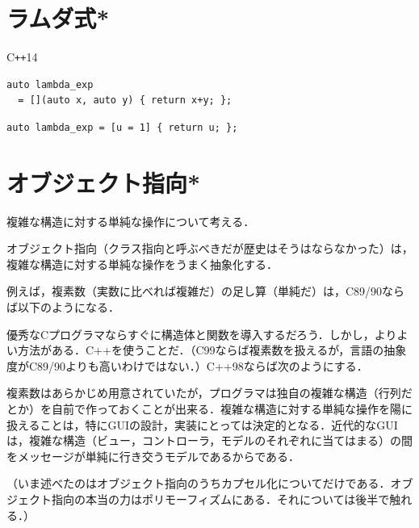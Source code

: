 \documentclass[a4paper,twocolumn]{jsbook}
\newcommand{\programminglanguage}[1]{\textsf{#1}}
\newcommand{\cxx}{\programminglanguage{C}\texttt{++}}
\newcommand{\cxxfourteen}{\cxx\programminglanguage{14}}
\begin{document}
\section{ラムダ式*}

\cxxfourteen
\begin{verbatim}
auto lambda_exp
  = [](auto x, auto y) { return x+y; };
\end{verbatim}

\begin{verbatim}
auto lambda_exp = [u = 1] { return u; };
\end{verbatim}



\section{オブジェクト指向*}

複雑な構造に対する単純な操作について考える．

オブジェクト指向（クラス指向と呼ぶべきだが歴史はそうはならなかった）は，複雑な構造に対する単純な操作をうまく抽象化する．

例えば，複素数（実数に比べれば複雑だ）の足し算（単純だ）は，C89/90ならば以下のようになる．


優秀なCプログラマならすぐに構造体と関数を導入するだろう．しかし，よりよい方法がある．C++を使うことだ．（C99ならば複素数を扱えるが，言語の抽象度がC89/90よりも高いわけではない．）C++98ならば次のようにする．


複素数はあらかじめ用意されていたが，プログラマは独自の複雑な構造（行列だとか）を自前で作っておくことが出来る．複雑な構造に対する単純な操作を陽に扱えることは，特にGUIの設計，実装にとっては決定的となる．近代的なGUIは，複雑な構造（ビュー，コントローラ，モデルのそれぞれに当てはまる）の間をメッセージが単純に行き交うモデルであるからである．

（いま述べたのはオブジェクト指向のうちカプセル化についてだけである．オブジェクト指向の本当の力はポリモーフィズムにある．それについては後半で触れる．）
\end{document}
